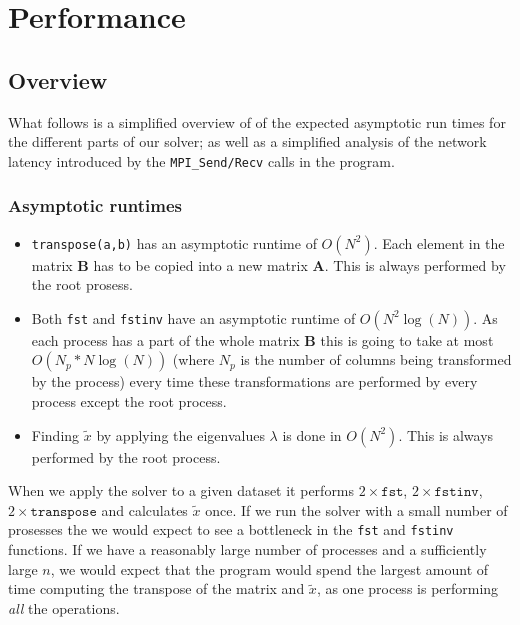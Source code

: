 \section{Performance} %
\label{sec:performance}

\subsection{Overview} %
\label{sub:overview}
What follows is a simplified overview of of the expected asymptotic run times for the different parts of our solver; as well as a simplified analysis of the network latency introduced by the \texttt{MPI\_Send/Recv} calls in the program.

\subsubsection{Asymptotic runtimes} %
\label{ssub:asymptotic_runtimes}

\begin{itemize}

  \item \texttt{transpose(a,b)} has an asymptotic runtime of $O(N^2)$. Each element in the matrix \textbf{B} has to be copied into a new matrix \textbf{A}. This is always performed by the root prosess.

  \item Both \texttt{fst} and \texttt{fstinv} have an asymptotic runtime of $O(N^2 \log(N))$. As each process has a part of the whole matrix \textbf{B} this is going to take at most $O(N_p * N\log(N))$ (where $N_p$ is the number of columns being transformed by the process) every time these transformations are performed by every process except the root process.

  \item Finding $\tilde{x}$ by applying the eigenvalues $\lambda$ is done in $O(N^2)$. This is always performed by the root process.

\end{itemize}

When we apply the solver to a given dataset it performs $2\times \mathtt{fst}$, $2\times \mathtt{fstinv}$, $2\times \mathtt{transpose}$ and calculates $\tilde{x}$ once. If we run the solver with a small number of prosesses the we would expect to see a bottleneck in the \texttt{fst} and \texttt{fstinv} functions. If we have a reasonably large number of processes and a sufficiently large $n$, we would expect that the program would spend the largest amount of time computing the transpose of the matrix and $\tilde{x}$, as one process is performing \emph{all} the operations.


